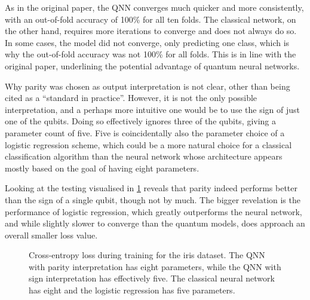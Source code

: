As in the original paper, the QNN converges much quicker and more consistently, with an out-of-fold accuracy of 100\% for all ten folds.
The classical network, on the other hand, requires more iterations to converge and does not always do so.
In some cases, the model did not converge, only predicting one class, which is why the out-of-fold accuracy was not 100\% for all folds.
This is in line with the original paper, underlining the potential advantage of quantum neural networks.

Why parity was chosen as output interpretation is not clear, other than being cited as a \enquote{standard in practice}.
However, it is not the only possible interpretation, and a perhaps more intuitive one would be to use the sign of just one of the qubits.
Doing so effectively ignores three of the qubits, giving a parameter count of five.
Five is coincidentally also the parameter choice of a logistic regression scheme, which could be a more natural choice for a classical classification algorithm than the neural network whose architecture appears mostly based on the goal of having eight parameters.

Looking at the testing visualised in \cref{fig:iris_training_lr} reveals that parity indeed performs better than the sign of a single qubit, though not by much.
The bigger revelation is the performance of logistic regression, which greatly outperforms the neural network, and while slightly slower to converge than the quantum models, does approach an overall smaller loss value.

\begin{figure}
    \centering
    \caption{
        Cross-entropy loss during training for the iris dataset.
        The QNN with parity interpretation has eight parameters, while the QNN with sign interpretation has effectively five.
        The classical neural network has eight and the logistic regression has five parameters.
    }
    \label{fig:iris_training_lr}
\end{figure}


